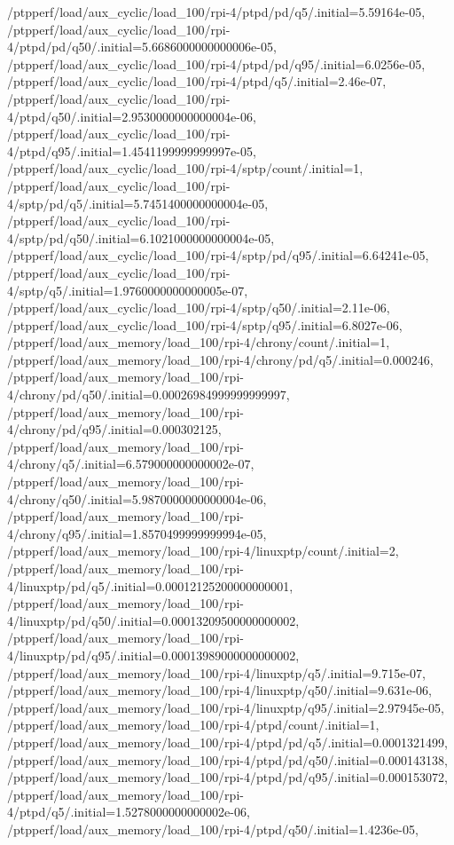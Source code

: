 {    /ptpperf/load/aux_cyclic/load_100/rpi-4/ptpd/pd/q5/.initial=5.59164e-05,
    /ptpperf/load/aux_cyclic/load_100/rpi-4/ptpd/pd/q50/.initial=5.6686000000000006e-05,
    /ptpperf/load/aux_cyclic/load_100/rpi-4/ptpd/pd/q95/.initial=6.0256e-05,
    /ptpperf/load/aux_cyclic/load_100/rpi-4/ptpd/q5/.initial=2.46e-07,
    /ptpperf/load/aux_cyclic/load_100/rpi-4/ptpd/q50/.initial=2.9530000000000004e-06,
    /ptpperf/load/aux_cyclic/load_100/rpi-4/ptpd/q95/.initial=1.4541199999999997e-05,
    /ptpperf/load/aux_cyclic/load_100/rpi-4/sptp/count/.initial=1,
    /ptpperf/load/aux_cyclic/load_100/rpi-4/sptp/pd/q5/.initial=5.7451400000000004e-05,
    /ptpperf/load/aux_cyclic/load_100/rpi-4/sptp/pd/q50/.initial=6.1021000000000004e-05,
    /ptpperf/load/aux_cyclic/load_100/rpi-4/sptp/pd/q95/.initial=6.64241e-05,
    /ptpperf/load/aux_cyclic/load_100/rpi-4/sptp/q5/.initial=1.9760000000000005e-07,
    /ptpperf/load/aux_cyclic/load_100/rpi-4/sptp/q50/.initial=2.11e-06,
    /ptpperf/load/aux_cyclic/load_100/rpi-4/sptp/q95/.initial=6.8027e-06,
    /ptpperf/load/aux_memory/load_100/rpi-4/chrony/count/.initial=1,
    /ptpperf/load/aux_memory/load_100/rpi-4/chrony/pd/q5/.initial=0.000246,
    /ptpperf/load/aux_memory/load_100/rpi-4/chrony/pd/q50/.initial=0.00026984999999999997,
    /ptpperf/load/aux_memory/load_100/rpi-4/chrony/pd/q95/.initial=0.000302125,
    /ptpperf/load/aux_memory/load_100/rpi-4/chrony/q5/.initial=6.579000000000002e-07,
    /ptpperf/load/aux_memory/load_100/rpi-4/chrony/q50/.initial=5.9870000000000004e-06,
    /ptpperf/load/aux_memory/load_100/rpi-4/chrony/q95/.initial=1.8570499999999994e-05,
    /ptpperf/load/aux_memory/load_100/rpi-4/linuxptp/count/.initial=2,
    /ptpperf/load/aux_memory/load_100/rpi-4/linuxptp/pd/q5/.initial=0.00012125200000000001,
    /ptpperf/load/aux_memory/load_100/rpi-4/linuxptp/pd/q50/.initial=0.00013209500000000002,
    /ptpperf/load/aux_memory/load_100/rpi-4/linuxptp/pd/q95/.initial=0.00013989000000000002,
    /ptpperf/load/aux_memory/load_100/rpi-4/linuxptp/q5/.initial=9.715e-07,
    /ptpperf/load/aux_memory/load_100/rpi-4/linuxptp/q50/.initial=9.631e-06,
    /ptpperf/load/aux_memory/load_100/rpi-4/linuxptp/q95/.initial=2.97945e-05,
    /ptpperf/load/aux_memory/load_100/rpi-4/ptpd/count/.initial=1,
    /ptpperf/load/aux_memory/load_100/rpi-4/ptpd/pd/q5/.initial=0.0001321499,
    /ptpperf/load/aux_memory/load_100/rpi-4/ptpd/pd/q50/.initial=0.000143138,
    /ptpperf/load/aux_memory/load_100/rpi-4/ptpd/pd/q95/.initial=0.000153072,
    /ptpperf/load/aux_memory/load_100/rpi-4/ptpd/q5/.initial=1.5278000000000002e-06,
    /ptpperf/load/aux_memory/load_100/rpi-4/ptpd/q50/.initial=1.4236e-05,
}
